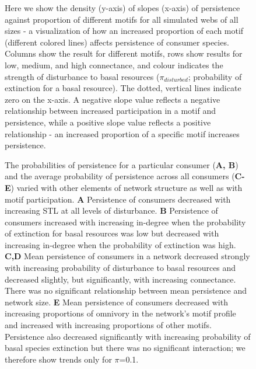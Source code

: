 \documentclass[12pt]{article}
\begin{document}
\begin{spacing}{1.0}
    \begin{figure}[hb!]
    \centering
        \caption{Here we show the density (y-axis) of slopes (x-axis) of persistence against proportion of different motifs for all simulated webs of all sizes - a visualization of how an increased proportion of each motif (different colored lines) affects persistence of consumer species. Columns show the result for different motifs, rows show results for low, medium, and high connectance, and colour indicates the strength of disturbance to basal resources ($\pi_{disturbed}$; probability of extinction for a basal resource). The dotted, vertical lines indicate zero on the x-axis. A negative slope value reflects a negative relationship between increased participation in a motif and persistence, while a positive slope value reflects a positive relationship - an increased proportion of a specific motif increases persistence.}
        \label{fig:density_prop}
    \end{figure}    


    \begin{figure}[ht!]
        \centering
        \caption{The probabilities of persistence for a particular consumer (\textbf{A, B}) and the average probability of persistence across all consumers (\textbf{C-E}) varied with other elements of network structure as well as with motif participation.
        \textbf{A} Persistence of consumers decreased with increasing STL at all levels of disturbance.
        \textbf{B} Persistence of consumers increased with increasing in-degree when the probability of extinction for basal resources was low but decreased with increasing in-degree when the probability of extinction was high.
        \textbf{C,D} Mean persistence of consumers in a network decreased strongly with increasing probability of disturbance to basal resources and decreased slightly, but significantly, with increasing connectance. There was no significant relationship between mean persistence and network size.
        \textbf{E} Mean persistence of consumers decreased with increasing proportions of omnivory in the network's motif profile and increased with increasing proportions of other motifs. Persistence also decreased significantly with increasing probability of basal species extinction but there was no significant interaction; we therefore show trends only for $\pi$=0.1.}
        \label{fig:lm_CS}
    \end{figure}


\end{spacing}
\end{document}
